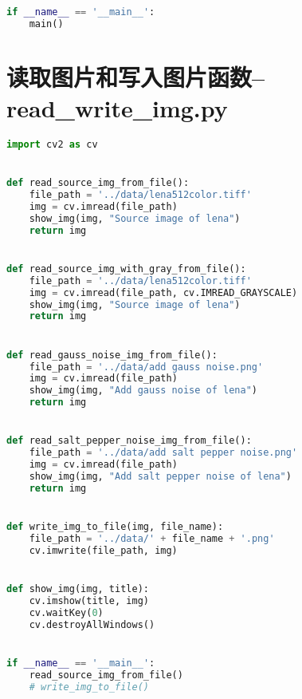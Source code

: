 \documentclass{hitreport}
\begin{document}
\begin{appendices}
\begin{lstlisting}[language=python]
if __name__ == '__main__':
    main()

\end{lstlisting}

\section{读取图片和写入图片函数--read\_write\_img.py}
\begin{lstlisting}[language=python]
import cv2 as cv


def read_source_img_from_file():
    file_path = '../data/lena512color.tiff'
    img = cv.imread(file_path)
    show_img(img, "Source image of lena")
    return img


def read_source_img_with_gray_from_file():
    file_path = '../data/lena512color.tiff'
    img = cv.imread(file_path, cv.IMREAD_GRAYSCALE)
    show_img(img, "Source image of lena")
    return img


def read_gauss_noise_img_from_file():
    file_path = '../data/add gauss noise.png'
    img = cv.imread(file_path)
    show_img(img, "Add gauss noise of lena")
    return img


def read_salt_pepper_noise_img_from_file():
    file_path = '../data/add salt pepper noise.png'
    img = cv.imread(file_path)
    show_img(img, "Add salt pepper noise of lena")
    return img


def write_img_to_file(img, file_name):
    file_path = '../data/' + file_name + '.png'
    cv.imwrite(file_path, img)


def show_img(img, title):
    cv.imshow(title, img)
    cv.waitKey(0)
    cv.destroyAllWindows()


if __name__ == '__main__':
    read_source_img_from_file()
    # write_img_to_file()

\end{lstlisting}

\end{appendices}
\end{document}
